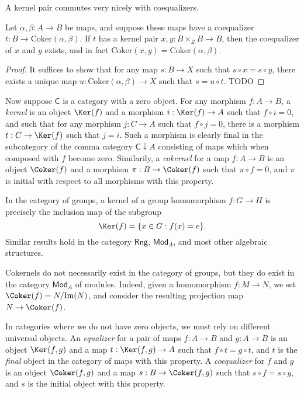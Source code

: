 A kernel pair commutes very nicely with coequalizers.

\begin{lemma}
    Let $\alpha,\beta: A \to B$ be maps, and suppose these maps have a coequalizer $t: B \to \text{Coker}(\alpha,\beta)$. If $t$ has a kernel pair $x,y: B \times_Z B \to B$, then the coequalizer of $x$ and $y$ exists, and in fact $\text{Coker}(x,y) = \text{Coker}(\alpha,\beta)$.
\end{lemma}
\begin{proof}
    It suffices to show that for any map $s: B \to X$ such that $s \circ x = s \circ y$, there exists a unique map $u: \text{Coker}(\alpha,\beta) \to X$ such that $s = u \circ t$. TODO
\end{proof}

Now suppose $\mathsf{C}$ is a category with a zero object. For any morphism $f: A \to B$, a \emph{kernel} is an object $\Ker(f)$ and a morphism $i: \Ker(f) \to A$ such that $f \circ i = 0$, and such that for any morphism $j: C \to A$ such that $f \circ j = 0$, there is a morphism $t: C \to \Ker(f)$ such that $j = i$. Such a morphism is clearly final in the subcategory of the comma category $\mathsf{C} \downarrow A$ consisting of maps which when composed with $f$ become zero. Similarily, a \emph{cokernel} for a map $f: A \to B$ is an object $\Coker(f)$ and a morphism $\pi: B \to \Coker(f)$ such that $\pi \circ f = 0$, and $\pi$ is initial with respect to all morphisms with this property.

\begin{example}
    In the category of groups, a kernel of a group homomorphism $f: G \to H$ is precisely the inclusion map of the subgroup
    \[ \Ker(f) = \{ x \in G: f(x) = e \}. \]
    Similar results hold in the category $\mathsf{Rng}$, $\mathsf{Mod}_A$, and most other algebraic structures.
\end{example}

\begin{example}
    Cokernels do not necessarily exist in the category of groups, but they do exist in the category $\mathsf{Mod}_A$ of modules. Indeed, given a homomorphism $f: M \to N$, we set $\Coker(f) = N/\text{Im}(N)$, and consider the resulting projection map $N \to \Coker(f)$.
\end{example}

In categories where we do not have zero objects, we must rely on different universal objects. An \emph{equalizer} for a pair of maps $f: A \to B$ and $g: A \to B$ is an object $\Ker(f,g)$ and a map $t: \Ker(f,g) \to A$ such that $f \circ t = g \circ t$, and $t$ is the \emph{final} object in the category of maps with this property. A \emph{coequalizer} for $f$ and $g$ is an object $\Coker(f,g)$ and a map $s: B \to \Coker(f,g)$ such that $s \circ f = s \circ g$, and $s$ is the initial object with this property.

